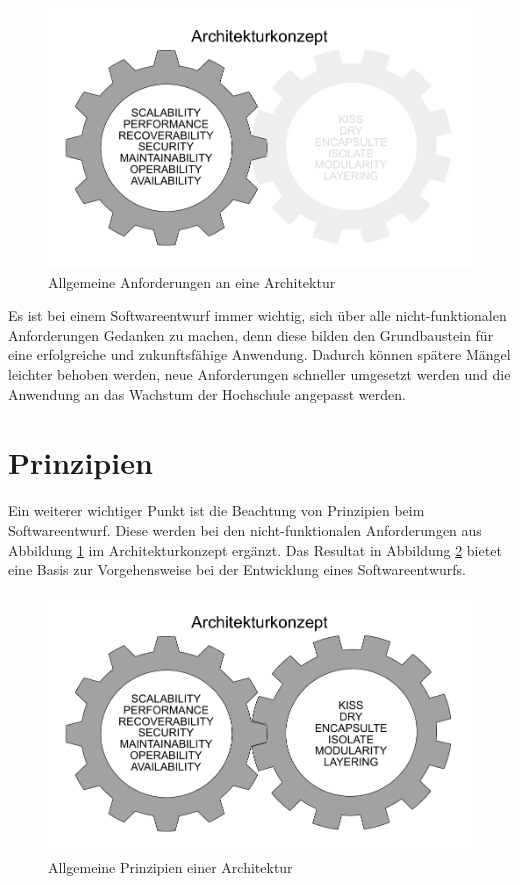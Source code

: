 \begin{figure}[H]
\centering
\includegraphics[width=\pictureWidth cm]{Bilder/Sonstiges/Anforderungen_Prinzipien-Transparent.pdf}
\caption{Allgemeine Anforderungen an eine Architektur\label{fig:anforderungen}\protect\footnotemark}
\end{figure}

Es ist bei einem Softwareentwurf immer wichtig, sich über alle nicht-funktionalen Anforderungen Gedanken zu machen, denn diese bilden den Grundbaustein für eine erfolgreiche und zukunftsfähige Anwendung. Dadurch können spätere Mängel leichter behoben werden, neue Anforderungen schneller umgesetzt werden und die Anwendung an das Wachstum der Hochschule angepasst werden.

\section{Prinzipien}
\label{sec:prinzipien}

Ein weiterer wichtiger Punkt ist die Beachtung von Prinzipien beim Softwareentwurf. Diese werden bei den nicht-funktionalen Anforderungen aus Abbildung \ref{fig:anforderungen} im Architekturkonzept ergänzt. Das Resultat in Abbildung \ref{fig:prinzip} bietet eine Basis zur Vorgehensweise bei der Entwicklung eines Softwareentwurfs.

\begin{figure}[H]
\centering
\includegraphics[width=\pictureWidth cm]{Bilder/Sonstiges/Anforderungen_Prinzipien.pdf}
\caption{Allgemeine Prinzipien einer Architektur\label{fig:prinzip}\protect\footnotemark}
\end{figure}

